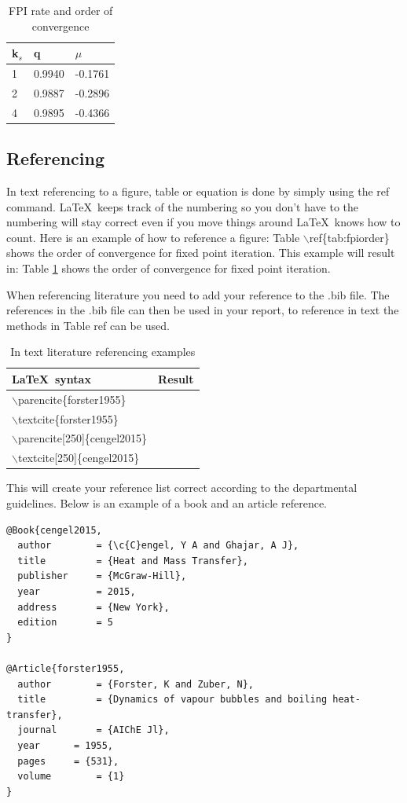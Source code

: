 \documentclass[a4paper,12pt]{article}
\begin{document}
\begin{table}[!ht]
\centering
\caption{FPI rate and order of convergence}
\label{tab:fpiorder}
\begin{tabular}{lll}
\toprule
k$_s$ & q & $\mu$  \\
\midrule
1 & 0.9940& -0.1761\\
2 & 0.9887 & -0.2896\\
4 & 0.9895& -0.4366\\
\bottomrule
\end{tabular}
\end{table}

\subsection{Referencing}
In text referencing to a figure, table or equation is done by simply using the ref command. \LaTeX\ keeps track of the numbering so you don't have to the numbering will stay correct even if you move things around \LaTeX\ knows how to count. Here is an example of how to reference a figure: Table $\backslash$ref\{tab:fpiorder\} shows the order of convergence for fixed point iteration. This example will result in: Table \ref{tab:fpiorder} shows the order of convergence for fixed point iteration.

When referencing literature you need to add your reference to the .bib file. The references in the .bib file can then be used in your report, to reference in text the methods in Table ref can be used.

\begin{table}[!ht]
\centering
\caption{In text literature referencing examples}
\label{tab:Cite}
\begin{tabular}{ll}
\toprule
\LaTeX\ syntax & Result\\
\midrule
$\backslash$parencite\{forster1955\} &\parencite{forster1955} \\
$\backslash$textcite\{forster1955\} & \textcite{forster1955} \\
$\backslash$parencite[250]\{cengel2015\} &\parencite[250]{cengel2015} \\
$\backslash$textcite[250]\{cengel2015\} & \textcite[250]{cengel2015} \\
\bottomrule
\end{tabular}
\end{table}

This will create your reference list correct according to the departmental guidelines. Below is an example of a book and an article reference.
\begin{lstlisting}
@Book{cengel2015,
  author		= {\c{C}engel, Y A and Ghajar, A J},
  title			= {Heat and Mass Transfer},
  publisher		= {McGraw-Hill},
  year			= 2015,
  address		= {New York},
  edition		= 5
}

@Article{forster1955,
  author		= {Forster, K and Zuber, N},
  title			= {Dynamics of vapour bubbles and boiling heat-transfer},
  journal		= {AIChE Jl},
  year		= 1955,
  pages		= {531},
  volume		= {1}
}
\end{lstlisting}
\end{document}
